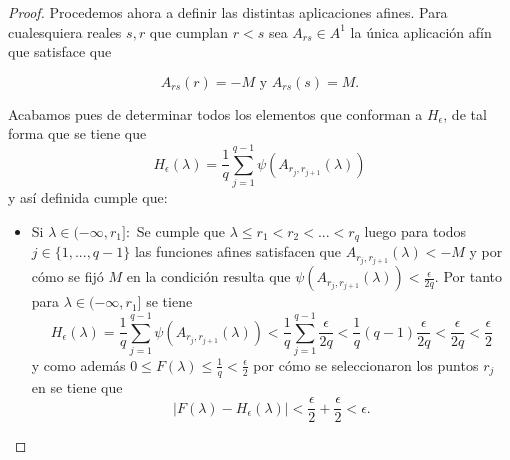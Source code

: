 \begin{proof}
    Procedemos ahora a definir las distintas aplicaciones afines. 
    Para cualesquiera reales $s,r$ que cumplan $r < s$ sea $A_{rs}\in A^1$ la única aplicación afín que satisface que 
    
    \begin{equation}
        A_{rs}(r) = -M \text{ y }  A_{rs}(s) = M. 
    \end{equation} 
    
    Acabamos pues de determinar todos los elementos que conforman a $H_\epsilon$, de tal forma que se tiene que
    \begin{equation}
        H_\epsilon(\lambda) = \frac{1}{q} \sum^{q-1}_{j=1} \psi( A_{r_j, r_{j+1}}(\lambda))
    \end{equation}
    y así definida cumple que: 
    \begin{itemize}
        \item Si $\lambda \in (- \infty, r_1]:$
        Se cumple que $\lambda \leq r_1 < r_2 <...< r_q$ luego  
        para todos $j \in \{1, ..., q-1\}$ las funciones afines satisfacen que 
        $A_{r_j, r_{j+1}}(\lambda) < -M$ y por cómo se fijó $M$ en la condición 
        resulta que  $\psi( A_{r_j, r_{j+1}}(\lambda)) < \frac{\epsilon}{2 q}$. Por tanto
        para $\lambda \in (- \infty, r_1]$ se tiene 
        \begin{equation}
            H_\epsilon(\lambda) = \frac{1}{q} \sum^{q-1}_{j=1} \psi( A_{r_j, r_{j+1}}(\lambda)) 
            <
            \frac{1}{q} \sum^{q-1}_{j=1}  \frac{\epsilon}{2q}
            < 
            \frac{1}{q} (q-1) \frac{\epsilon }{2q}
            <\frac{\epsilon }{2q}
            < \frac{\epsilon }{2}
        \end{equation}
        y como además $0 \leq F(\lambda) \leq \frac{1}{q} < \frac{\epsilon}{2}$ por cómo se seleccionaron los puntos $r_j$ en 
         se tiene que 
        \begin{equation}
            | F(\lambda) - H_{\epsilon}(\lambda) | < \frac{\epsilon}{2} + \frac{\epsilon}{2} < \epsilon. 
        \end{equation}


\end{itemize}
\end{proof}
